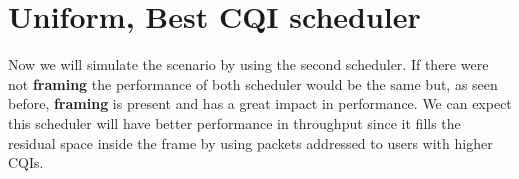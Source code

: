 \section{Uniform, Best CQI scheduler}
Now we will simulate the scenario by using the second scheduler. If there were not \textbf{framing} the performance of both scheduler would be the same but, as seen before, \textbf{framing} is present and has a great impact in performance. We can expect this scheduler will have better performance in throughput since it fills the residual space inside the frame by using packets addressed to users with higher CQIs.